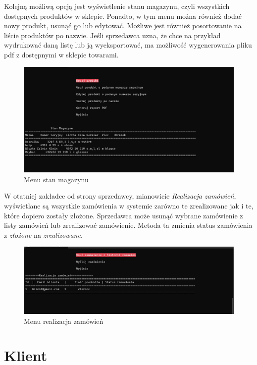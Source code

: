 Kolejną możliwą opcją jest wyświetlenie stanu magazynu, czyli wszystkich dostępnych produktów w sklepie. Ponadto, w tym menu można również dodać nowy produkt, usunąć go lub edytować. Możliwe jest również posortowanie na liście produktów po nazwie. Jeśli sprzedawca uzna, że chce na przykład wydrukować daną listę lub ją wyeksportować, ma możliwość wygenerowania pliku pdf z dostępnymi w sklepie towarami.

\begin{figure}[H]
	\centering
		\includegraphics[width=15cm]{screeny/lista_produktow_sprz.png}
	\caption{\footnotesize Menu stan magazynu}
	\label{fig:plotend}
\end{figure}

W otatniej zakładce od strony sprzedawcy, mianowicie \textit{Realizacja zamówień}, wyświetlane są wszystkie zamówienia w systemie zarówno te zrealizowane jak i te, które dopiero zostały złożone. Sprzedawca może usunąć wybrane zamówienie z listy zamówień lub zrealizować zamówienie. Metoda ta zmienia status zamówienia z \textit{złożone} na \textit{zrealizowane}.

\begin{figure}[H]
	\centering
		\includegraphics[width=15cm]{screeny/zamowienia_sprzedawca.png}
	\caption{\footnotesize Menu realizacja zamówień}
	\label{fig:plotend}
\end{figure}

\section{Klient}

